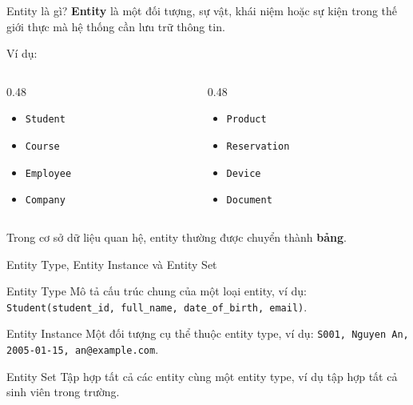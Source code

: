\documentclass[aspectratio=169,11pt]{beamer}
\newcommand{\keyword}[1]{\textcolor{accent}{\textbf{#1}}}
\newcommand{\kw}[1]{\keyword{#1}}
\newcommand{\smallitem}{\setlength{\itemsep}{2pt}\setlength{\parskip}{0pt}}
\begin{document}
\begin{frame}{Entity là gì?}
\small
\kw{Entity} là một đối tượng, sự vật, khái niệm hoặc sự kiện trong thế giới thực mà hệ thống cần lưu trữ thông tin.

\vspace{2mm}
Ví dụ:
\begin{columns}[T]
\begin{column}{0.48\textwidth}
\begin{itemize}
\smallitem
  \item \texttt{Student}
  \item \texttt{Course}
  \item \texttt{Employee}
  \item \texttt{Company}
\end{itemize}
\end{column}
\begin{column}{0.48\textwidth}
\begin{itemize}
\smallitem
  \item \texttt{Product}
  \item \texttt{Reservation}
  \item \texttt{Device}
  \item \texttt{Document}
\end{itemize}
\end{column}
\end{columns}

\vspace{2mm}
Trong cơ sở dữ liệu quan hệ, entity thường được chuyển thành \kw{bảng}.
\end{frame}

\begin{frame}{Entity Type, Entity Instance và Entity Set}
\small
\begin{block}{Entity Type}
Mô tả cấu trúc chung của một loại entity, ví dụ: \texttt{Student(student\_id, full\_name, date\_of\_birth, email)}.
\end{block}

\begin{block}{Entity Instance}
Một đối tượng cụ thể thuộc entity type, ví dụ: \texttt{S001, Nguyen An, 2005-01-15, an@example.com}.
\end{block}

\begin{block}{Entity Set}
Tập hợp tất cả các entity cùng một entity type, ví dụ tập hợp tất cả sinh viên trong trường.
\end{block}
\end{frame}
\end{document}
